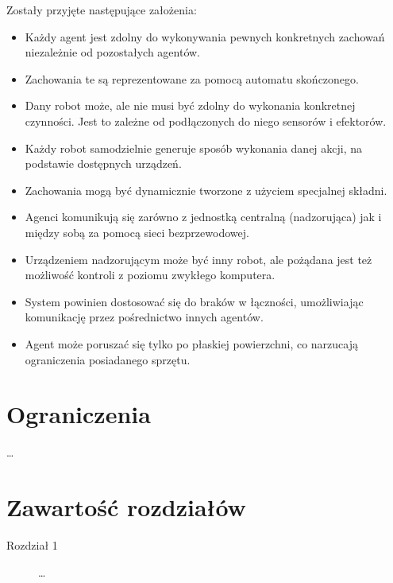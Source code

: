 Zostały przyjęte następujące założenia:
\begin{itemize}
  \item Każdy agent jest zdolny do wykonywania pewnych konkretnych zachowań niezależnie od pozostałych agentów.
  \item Zachowania te są reprezentowane za pomocą automatu skończonego.
  \item Dany robot może, ale nie musi być zdolny do wykonania konkretnej czynności. Jest to zależne od podłączonych do niego sensorów i efektorów.
  \item Każdy robot samodzielnie generuje sposób wykonania danej akcji, na podstawie dostępnych urządzeń.
  \item Zachowania mogą być dynamicznie tworzone z użyciem specjalnej składni.
  \item Agenci komunikują się zarówno z jednostką centralną (nadzorująca) jak i między sobą za pomocą sieci bezprzewodowej.
  \item Urządzeniem nadzorującym może być inny robot, ale pożądana jest też możliwość kontroli z poziomu zwykłego komputera.
  \item System powinien dostosować się do braków w łączności, umożliwiając komunikację przez pośrednictwo innych agentów.
  \item Agent może poruszać się tylko po płaskiej powierzchni, co narzucają ograniczenia posiadanego sprzętu.
\end{itemize}

\section{Ograniczenia}

\ldots

\section{Zawartość rozdziałów}

\begin{description}
  \item[Rozdział 1] \ldots
\end{description}

